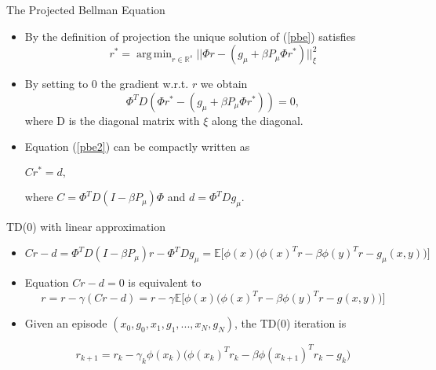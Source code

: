\documentclass{beamer}
\def\R{{\mathbb R}}
\def\E{{\mathbb E}}
\DeclareMathOperator*{\argmin}{arg\,min}
\begin{document}
\begin{frame}{The Projected Bellman Equation}



\begin{itemize}
\item By the definition of projection the unique solution of (\ref{pbe}) satisfies
$$
r^* = \argmin_{r\in \R^s} || \Phi r - (g_\mu+\beta P_\mu\Phi r^* )||_\xi^2
$$

\item By setting to 0 the gradient w.r.t. $r$ we obtain 
\begin{equation}\label{pbe2}
\Phi^TD(\Phi r^* - (g_\mu+\beta P_\mu\Phi r^*))=0,
\end{equation}
where D is the diagonal matrix with $\xi$ along the diagonal.

\item Equation (\ref{pbe2}) can be compactly written as
\begin{center}
$
Cr^* = d,
$
\end{center}
where $C = \Phi^TD(I-\beta P_\mu) \Phi$ and $d = \Phi^T Dg_\mu.$
\end{itemize}\end{frame}


\begin{frame}{TD(0) with linear approximation}



\begin{itemize}
\item 
\begin{center}
$Cr -d = \Phi^TD(I-\beta P_\mu)r -\Phi^T Dg_\mu = \E\Big[ \phi(x)\Big(\phi(x)^Tr - \beta\phi(y)^T r - g_\mu(x, y)\Big) \Big] $$
$
\end{center}


\item Equation $Cr-d=0$ is equivalent to 
$$
r = r -\gamma (Cr-d) = r-\gamma\E\Big[ \phi(x)\Big(\phi(x)^Tr - \beta\phi(y)^T r - g(x, y)\Big) \Big]
$$

\item Given an episode $(x_0, g_0, x_1, g_1, ..., x_N, g_N)$, the  TD(0) iteration is

$$
r_{k+1} = r_k - \gamma_k\phi(x_k)\Big(\phi(x_k)^Tr_k - \beta\phi(x_{k+1})^T r_k - g_k\Big)  
$$

\end{itemize}
\end{frame}
\end{document}
